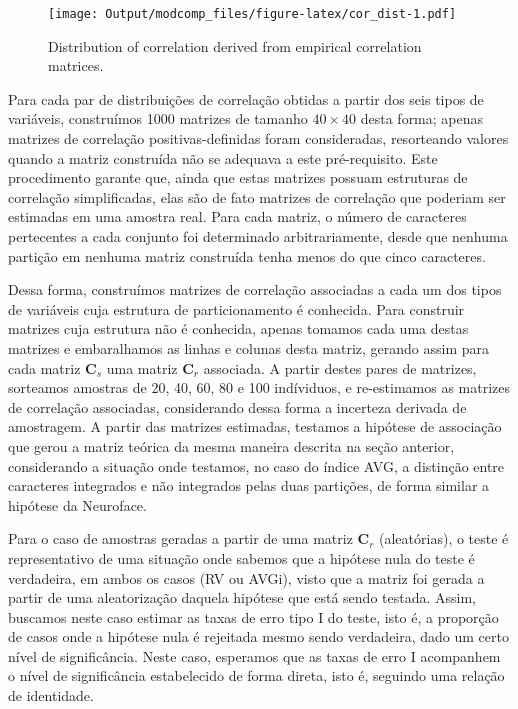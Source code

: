 \documentclass[11pt,]{article}
\begin{document}
\begin{figure}[htbp]
\centering
\texttt{[image: Output/modcomp\_files/figure-latex/cor\_dist-1.pdf]}
\caption{Distribution of correlation derived from empirical correlation
matrices. \label{fig:cor_dist}}
\end{figure}

Para cada par de distribuições de correlação obtidas a partir dos seis
tipos de variáveis, construímos 1000 matrizes de tamanho $40 \times 40$
desta forma; apenas matrizes de correlação positivas-definidas foram
consideradas, resorteando valores quando a matriz construída não se
adequava a este pré-requisito. Este procedimento garante que, ainda que
estas matrizes possuam estruturas de correlação simplificadas, elas são
de fato matrizes de correlação que poderiam ser estimadas em uma amostra
real. Para cada matriz, o número de caracteres pertecentes a cada
conjunto foi determinado arbitrariamente, desde que nenhuma partição em
nenhuma matriz construída tenha menos do que cinco caracteres.

Dessa forma, construímos matrizes de correlação associadas a cada um dos
tipos de variáveis cuja estrutura de particionamento é conhecida. Para
construir matrizes cuja estrutura não é conhecida, apenas tomamos cada
uma destas matrizes e embaralhamos as linhas e colunas desta matriz,
gerando assim para cada matriz $\mathbf{C}_s$ uma matriz $\mathbf{C}_r$
associada. A partir destes pares de matrizes, sorteamos amostras de 20,
40, 60, 80 e 100 indíviduos, e re-estimamos as matrizes de correlação
associadas, considerando dessa forma a incerteza derivada de amostragem.
A partir das matrizes estimadas, testamos a hipótese de associação que
gerou a matriz teórica da mesma maneira descrita na seção anterior,
considerando a situação onde testamos, no caso do índice AVG, a
distinção entre caracteres integrados e não integrados pelas duas
partições, de forma similar a hipótese da Neuroface.

Para o caso de amostras geradas a partir de uma matriz $\mathbf{C}_r$
(aleatórias), o teste é representativo de uma situação onde sabemos que
a hipótese nula do teste é verdadeira, em ambos os casos (RV ou AVGi),
visto que a matriz foi gerada a partir de uma aleatorização daquela
hipótese que está sendo testada. Assim, buscamos neste caso estimar as
taxas de erro tipo I do teste, isto é, a proporção de casos onde a
hipótese nula é rejeitada mesmo sendo verdadeira, dado um certo nível de
significância. Neste caso, esperamos que as taxas de erro I acompanhem o
nível de significância estabelecido de forma direta, isto é, seguindo
uma relação de identidade.
\end{document}
